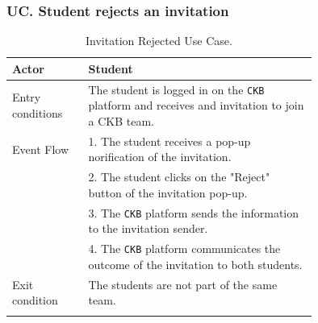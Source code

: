 \subsubsection*{UC\cuc . Student rejects an invitation}
\begin{center}
    \begin{longtable}{lp{0.75\linewidth}}
        \hline
        Actor            & Student                                                                                                                                                                               \\
        \hline
        Entry conditions & The student is logged in on the \verb|CKB| platform and receives and invitation to join a CKB team.                                                                                                               \\
        \hline
        Event Flow       
        & 1. The student receives a pop-up norification of the invitation.\\
        & 2. The student clicks on the "Reject" button of the invitation pop-up.\\
        & 3. The \verb|CKB| platform sends the information to the invitation sender.\\
        & 4. The \verb|CKB| platform communicates the outcome of the invitation to both students.\\
        \hline
        Exit condition   & The students are not part of the same team.   \\                                                                                                                                                                           
        \hline
        \caption{Invitation Rejected Use Case.}
        \label{tab: invitation_rejected_use_case}
    \end{longtable}

\end{center}


